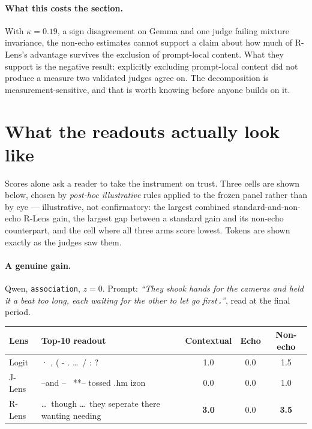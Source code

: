\documentclass[11pt]{article}
\newcommand{\flag}[1]{\textcolor{flagged}{#1}}
\begin{document}
\paragraph{What this costs the section.} With $\kappa = 0.19$, a sign
disagreement on Gemma and one judge failing mixture invariance, the non-echo
estimates cannot support a claim about how much of R-Lens's advantage survives
the exclusion of prompt-local content. \flag{What they support is the negative
result: explicitly excluding prompt-local content did not produce a measure two
validated judges agree on.} The decomposition is measurement-sensitive, and that
is worth knowing before anyone builds on it.

\section{What the readouts actually look like}
\label{sec:examples}

Scores alone ask a reader to take the instrument on trust. Three cells are shown
below, chosen by \emph{post-hoc illustrative} rules applied to the frozen panel
rather than by eye --- illustrative, not confirmatory: the largest
combined standard-and-non-echo R-Lens gain, the largest gap between a standard
gain and its non-echo counterpart, and the cell where all three arms score
lowest. Tokens are shown exactly as the judges saw them.

\newcommand{\tok}[1]{{\ttfamily\footnotesize #1}}

\paragraph{A genuine gain.} Qwen, \texttt{association}, $z = 0$. Prompt:
\emph{``They shook hands for the cameras and held it a beat too long, each
waiting for the other to let go first\,\textbf{.}''}, read at the final period.

\begin{center}\small
\begin{tabular}{llccc}
\toprule
Lens & Top-10 readout & Contextual & Echo & Non-echo \\
\midrule
Logit & \tok{· , ( - . \ldots\ / : ?} & 1.0 & 0.0 & 1.5 \\
J-Lens & \tok{--and -- \textbullet\ **-- tossed .hm izon} & 0.0 & 0.0 & 1.0 \\
R-Lens & \tok{\ldots\ though \ldots\ they seperate there wanting needing} & \textbf{3.0} & 0.0 & \textbf{3.5} \\
\bottomrule
\end{tabular}
\end{center}
\end{document}
